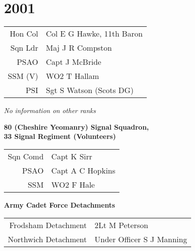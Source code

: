 \chapter*{2001}

\begin{center}
  \small
  \begin{tabular}{rl}
    Hon Col & Col E G Hawke, 11th Baron \\
    Sqn Ldr & Maj J R Compston \\
    PSAO & Capt J McBride \\
    SSM (V) & WO2 T Hallam \\
    PSI & Sgt S Watson (Scots DG) \\
  \end{tabular}
\end{center}

\begin{center}
  \textit{No information on other ranks}
\end{center}

\begin{center}
  \Large
  \textbf{80 (Cheshire Yeomanry) Signal Squadron, \\ 33 Signal Regiment (Volunteers)}
\end{center}

\begin{center}
  \small
  \begin{tabular}{rl}
    Sqn Comd & Capt K Sirr \\
    PSAO & Capt A C Hopkins \\
    SSM & WO2 F Hale \\
  \end{tabular}
\end{center}

\begin{center}
  \Large
  \textbf{Army Cadet Force Detachments}
\end{center}

\begin{center}
  \small
  \begin{tabular}{rl}
    Frodsham Detachment & 2Lt M Peterson \\
    Northwich Detachment & Under Officer S J Manning \\
  \end{tabular}
\end{center}

\vspace{50mm}

\pagebreak
